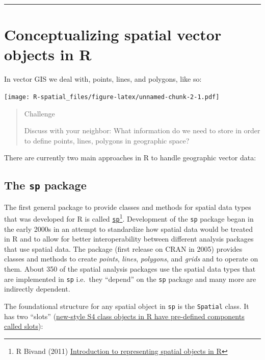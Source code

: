 \documentclass[]{book}
\let\rmarkdownfootnote\footnote%
\def\footnote{\protect\rmarkdownfootnote}
\begin{document}
\begin{center}\rule{0.5\linewidth}{\linethickness}\end{center}

\section{Conceptualizing spatial vector objects in
R}\label{conceptualizing-spatial-vector-objects-in-r}

In vector GIS we deal with, points, lines, and polygons, like so:

\texttt{[image: R-spatial\_files/figure-latex/unnamed-chunk-2-1.pdf]}

\begin{quote}
Challenge

Discuss with your neighbor: What information do we need to store in
order to define points, lines, polygons in geographic space?
\end{quote}

There are currently two main approaches in R to handle geographic vector
data:

\subsection{\texorpdfstring{The \texttt{sp}
package}{The sp package}}\label{the-sp-package}

The first general package to provide classes and methods for spatial
data types that was developed for R is called
\href{https://cran.r-project.org/package=sp}{\texttt{sp}}\footnote{R
  Bivand (2011)
  \href{http://geostat-course.org/system/files/monday_slides.pdf}{Introduction
  to representing spatial objects in R}}. Development of the \texttt{sp}
package began in the early 2000s in an attempt to standardize how
spatial data would be treated in R and to allow for better
interoperability between different analysis packages that use spatial
data. The package (first release on CRAN in 2005) provides classes and
methods to create \emph{points}, \emph{lines}, \emph{polygons}, and
\emph{grids} and to operate on them. About 350 of the spatial analysis
packages use the spatial data types that are implemented in \texttt{sp}
i.e.~they ``depend'' on the \texttt{sp} package and many more are
indirectly dependent.

The foundational structure for any spatial object in \texttt{sp} is the
\texttt{Spatial} class. It has two ``slots''
(\href{http://stackoverflow.com/a/4714080}{new-style S4 class objects in
R have pre-defined components called slots}):
\end{document}

